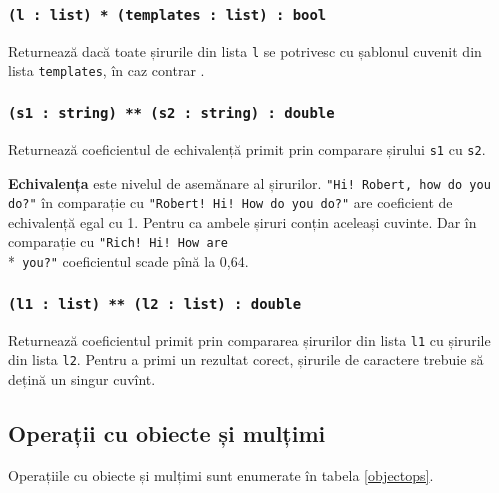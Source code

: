 \subsubsection{\texttt{(l : list) * (templates : list) : bool}}

Returnează \true{} dacă toate șirurile din lista \texttt{l} se potrivesc cu șablonul cuvenit din lista \texttt{templates}, în caz contrar \false{}.

\subsubsection{\texttt{(s1 : string) ** (s2 : string) : double}}

Returnează coeficientul de echivalență primit prin comparare șirului \texttt{s1} cu \texttt{s2}.

{\bf Echivalența} este nivelul de asemănare al șirurilor. \texttt{"Hi! Robert, how do you do?"} în comparație cu \texttt{"Robert! Hi! How do you do?"} are coeficient de echivalență egal cu 1. Pentru ca ambele șiruri conțin aceleași cuvinte. Dar în comparație cu  \texttt{"Rich! Hi! How are}\\*\texttt{ you?"} coeficientul scade pînă la 0,64.

\subsubsection{\texttt{(l1 : list) ** (l2 : list) : double}}

Returnează coeficientul primit prin compararea șirurilor din lista \texttt{l1} cu șirurile din lista \texttt{l2}.
Pentru a primi un rezultat corect, șirurile de caractere trebuie să dețină un singur cuvînt.

\subsection{Operații cu obiecte și mulțimi}

Operațiile cu obiecte și mulțimi sunt enumerate în tabela \ref{objectops}.

